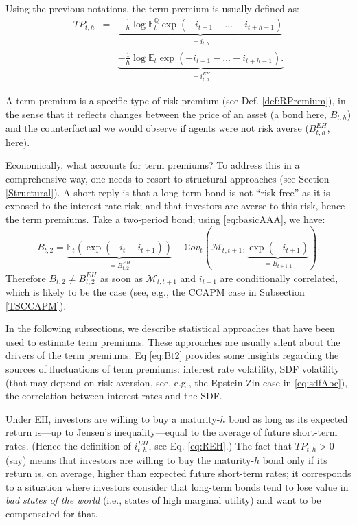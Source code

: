 \documentclass[
  12pt,
]{book}
\theoremstyle{definition}
\theoremstyle{definition}
\theoremstyle{definition}
\theoremstyle{definition}
\theoremstyle{remark}
\begin{document}
Using the previous notations, the term premium is usually defined as:
\begin{eqnarray}
TP_{t,h} &=& \underbrace{- \frac{1}{h} \log  \mathbb{E}^{\mathbb{Q}}_t \exp(-i_{t+1}-\dots-i_{t+h-1})}_{=i_{t,h}} \nonumber \\
&& \underbrace{- \frac{1}{h}  \log  \mathbb{E}_t \exp(-i_{t+1}-\dots-i_{t+h-1}).}_{=i^{EH}_{t,h}}\label{eq:TP}
\end{eqnarray}

A term premium is a specific type of risk premium (see Def. \ref{def:RPremium}), in the sense that it reflects changes between the price of an asset (a bond here, \(B_{t,h}\)) and the counterfactual we would observe if agents were not risk averse (\(B_{t,h}^{EH}\), here).

Economically, what accounts for term premiums? To address this in a comprehensive way, one needs to resort to structural approaches (see Section \ref{Structural}). A short reply is that a long-term bond is not ``risk-free'' as it is exposed to the interest-rate risk; and that investors are averse to this risk, hence the term premiums. Take a two-period bond; using \eqref{eq:basicAAA}, we have:
\begin{equation}
B_{t,2} = \underbrace{\mathbb{E}_t(\exp(-i_t-i_{t+1}))}_{= B^{EH}_{t,2}} + \mathbb{C}ov_t(\mathcal{M}_{t,t+1},\underbrace{\exp(-i_{t+1})}_{=B_{t+1,1}}).\label{eq:Bt2}
\end{equation}
Therefore \(B_{t,2} \ne B_{t,2}^{EH}\) as soon as \(\mathcal{M}_{t,t+1}\) and \(i_{t+1}\) are conditionally correlated, which is likely to be the case (see, e.g., the CCAPM case in Subsection \ref{TSCCAPM}).

In the following subsections, we describe statistical approaches that have been used to estimate term premiums. These approaches are usually silent about the drivers of the term premiums. Eq \eqref{eq:Bt2} provides some insights regarding the sources of fluctuations of term premiums: interest rate volatility, SDF volatility (that may depend on risk aversion, see, e.g., the Epstein-Zin case in \eqref{eq:sdfAbc}), the correlation between interest rates and the SDF.

Under EH, investors are willing to buy a maturity-\(h\) bond as long as its expected return is---up to Jensen's inequality---equal to the average of future short-term rates. (Hence the definition of \(i^{EH}_{t,h}\), see Eq. \eqref{eq:REH}.) The fact that \(TP_{t,h}>0\) (say) means that investors are willing to buy the maturity-\(h\) bond only if its return is, on average, higher than expected future short-term rates; it corresponds to a situation where investors consider that long-term bonds tend to lose value in \emph{bad states of the world} (i.e., states of high marginal utility) and want to be compensated for that.
\end{document}
